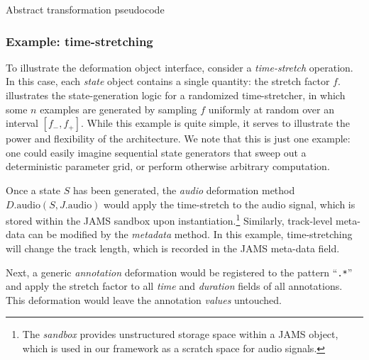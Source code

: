 \documentclass{article}
\begin{document}
\begin{algorithm}[t]
\caption{Abstract transformation pseudocode\label{alg:transformation}}
\begin{algorithmic}[1]
            \EndFor{}
        \EndFor{}
    \EndFor{}
    \EndFunction{}
\end{algorithmic}
\end{algorithm}


\subsubsection{Example: time-stretching}
To illustrate the deformation object interface, consider a \emph{time-stretch} operation.
In this case, each \emph{state} object contains a single quantity: the stretch factor $f$.
 illustrates the state-generation logic for a randomized
time-stretcher, in which some $n$ examples are generated by sampling $f$ uniformly at
random over an interval $[f_-, f_+]$.  While this example is quite
simple, it serves to illustrate the power and flexibility of the architecture.  We note
that this is just one example: one could easily imagine sequential state generators that
sweep out a deterministic parameter grid, or perform otherwise arbitrary computation.

Once a state $S$ has been generated, the \emph{audio} deformation method
$D.\text{audio}(S, J.\text{audio})$
would apply the time-stretch to the audio signal, which is stored within the
JAMS sandbox upon instantiation.\footnote{The \emph{sandbox} provides unstructured
storage space within a JAMS object, which is used in our framework as a scratch space for
audio signals.}  Similarly, track-level meta-data can be modified by the \emph{metadata}
method.  In this example, time-stretching will change the track length, which is recorded
in the JAMS meta-data field.

Next, a generic \emph{annotation} deformation would be registered to the pattern
``\texttt{.*}'' and apply the stretch factor to all \emph{time} and \emph{duration}
fields of all annotations.  This deformation would leave the annotation
\emph{values} untouched.
\end{document}
